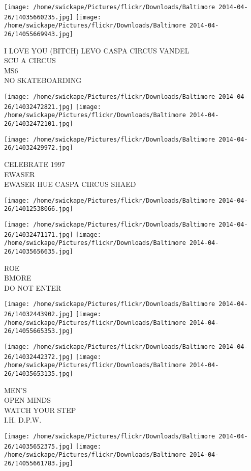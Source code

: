 \documentclass[10pt,letterpaper]{article}
\begin{document}
\texttt{[image: /home/swickape/Pictures/flickr/Downloads/Baltimore 2014-04-26/14035660235.jpg]}
\texttt{[image: /home/swickape/Pictures/flickr/Downloads/Baltimore 2014-04-26/14055669943.jpg]}

I LOVE YOU (BITCH) LEVO CASPA CIRCUS VANDEL\\
SCU A CIRCUS\\
MS6\\
NO SKATEBOARDING
\pagebreak

\texttt{[image: /home/swickape/Pictures/flickr/Downloads/Baltimore 2014-04-26/14032472821.jpg]}
\texttt{[image: /home/swickape/Pictures/flickr/Downloads/Baltimore 2014-04-26/14032472101.jpg]}

\vspace{0.25in}
\texttt{[image: /home/swickape/Pictures/flickr/Downloads/Baltimore 2014-04-26/14032429972.jpg]}

CELEBRATE 1997\\
EWASER\\
EWASER HUE CASPA CIRCUS SHAED
\pagebreak

\texttt{[image: /home/swickape/Pictures/flickr/Downloads/Baltimore 2014-04-26/14012538066.jpg]}

\vspace{0.25in}
\texttt{[image: /home/swickape/Pictures/flickr/Downloads/Baltimore 2014-04-26/14032471171.jpg]}
\texttt{[image: /home/swickape/Pictures/flickr/Downloads/Baltimore 2014-04-26/14035656635.jpg]}

ROE\\
BMORE\\
DO NOT ENTER
\pagebreak

\texttt{[image: /home/swickape/Pictures/flickr/Downloads/Baltimore 2014-04-26/14032443902.jpg]}
\texttt{[image: /home/swickape/Pictures/flickr/Downloads/Baltimore 2014-04-26/14055665353.jpg]}

\texttt{[image: /home/swickape/Pictures/flickr/Downloads/Baltimore 2014-04-26/14032442372.jpg]}
\texttt{[image: /home/swickape/Pictures/flickr/Downloads/Baltimore 2014-04-26/14035653135.jpg]}

MEN'S\\
OPEN MINDS\\
WATCH YOUR STEP\\
I.H. D.P.W.
\pagebreak

\texttt{[image: /home/swickape/Pictures/flickr/Downloads/Baltimore 2014-04-26/14035652375.jpg]}
\texttt{[image: /home/swickape/Pictures/flickr/Downloads/Baltimore 2014-04-26/14055661783.jpg]}
\end{document}
